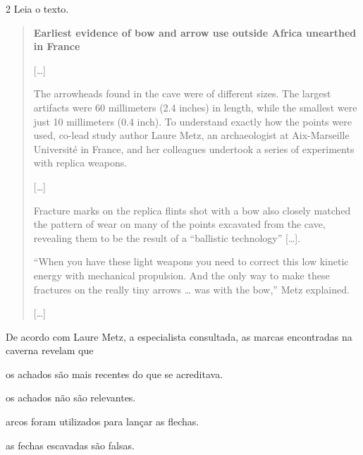 
\num{2} Leia o texto.

\begin{quote}
\textbf{Earliest evidence of bow and arrow use outside Africa unearthed in France}

{[}\ldots{}{]}

The arrowheads found in the cave were of different sizes. The largest
artifacts were 60 millimeters (2.4 inches) in length, while the smallest
were just 10 millimeters (0.4 inch). To understand exactly how the
points were used, co-lead study author Laure Metz, an archaeologist at
Aix-Marseille Université in France, and her colleagues undertook a
series of experiments with replica weapons.

{[}\ldots{}{]}

Fracture marks on the replica flints shot with a bow also closely
matched the pattern of wear on many of the points excavated from the
cave, revealing them to be the result of a ``ballistic technology''
{[}\ldots{}{]}.

``When you have these light weapons you need to correct this low kinetic
energy with mechanical propulsion. And the only way to make these
fractures on the really tiny arrows \ldots{} was with the bow,'' Metz
explained.

{[}\ldots{}{]}

\end{quote}

De acordo com Laure Metz, a especialista consultada, as marcas encontradas na caverna revelam que

\begin{escolha}
\item os achados são mais recentes do que se acreditava.

\item os achados não são relevantes.

\item arcos foram utilizados para lançar as flechas.

\item as fechas escavadas são falsas.
\end{escolha}


